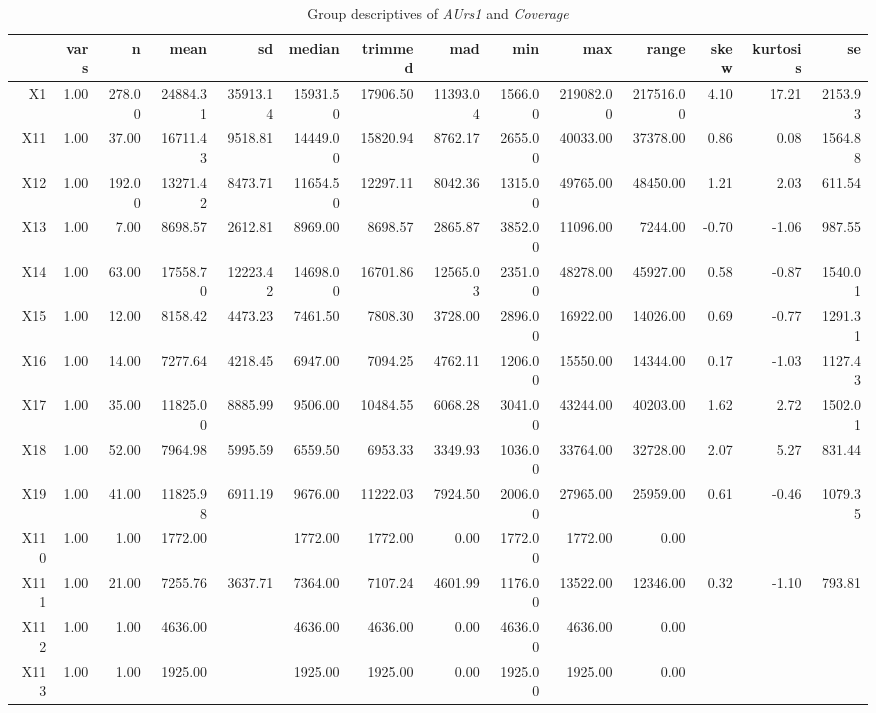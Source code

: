 \begin{table}[ht]
	\small
	\centering
	\begin{tabular}{rrrrrrrrrrrrrr}
		\hline
	   & vars & n & mean & sd & median & trimmed & mad & min & max & range & skew & kurtosis & se \\ 
		\hline
	  X1 & 1.00 & 278.00 & 24884.31 & 35913.14 & 15931.50 & 17906.50 & 11393.04 & 1566.00 & 219082.00 & 217516.00 & 4.10 & 17.21 & 2153.93 \\ 
		X11 & 1.00 & 37.00 & 16711.43 & 9518.81 & 14449.00 & 15820.94 & 8762.17 & 2655.00 & 40033.00 & 37378.00 & 0.86 & 0.08 & 1564.88 \\ 
		X12 & 1.00 & 192.00 & 13271.42 & 8473.71 & 11654.50 & 12297.11 & 8042.36 & 1315.00 & 49765.00 & 48450.00 & 1.21 & 2.03 & 611.54 \\ 
		X13 & 1.00 & 7.00 & 8698.57 & 2612.81 & 8969.00 & 8698.57 & 2865.87 & 3852.00 & 11096.00 & 7244.00 & -0.70 & -1.06 & 987.55 \\ 
		X14 & 1.00 & 63.00 & 17558.70 & 12223.42 & 14698.00 & 16701.86 & 12565.03 & 2351.00 & 48278.00 & 45927.00 & 0.58 & -0.87 & 1540.01 \\ 
		X15 & 1.00 & 12.00 & 8158.42 & 4473.23 & 7461.50 & 7808.30 & 3728.00 & 2896.00 & 16922.00 & 14026.00 & 0.69 & -0.77 & 1291.31 \\ 
		X16 & 1.00 & 14.00 & 7277.64 & 4218.45 & 6947.00 & 7094.25 & 4762.11 & 1206.00 & 15550.00 & 14344.00 & 0.17 & -1.03 & 1127.43 \\ 
		X17 & 1.00 & 35.00 & 11825.00 & 8885.99 & 9506.00 & 10484.55 & 6068.28 & 3041.00 & 43244.00 & 40203.00 & 1.62 & 2.72 & 1502.01 \\ 
		X18 & 1.00 & 52.00 & 7964.98 & 5995.59 & 6559.50 & 6953.33 & 3349.93 & 1036.00 & 33764.00 & 32728.00 & 2.07 & 5.27 & 831.44 \\ 
		X19 & 1.00 & 41.00 & 11825.98 & 6911.19 & 9676.00 & 11222.03 & 7924.50 & 2006.00 & 27965.00 & 25959.00 & 0.61 & -0.46 & 1079.35 \\ 
		X110 & 1.00 & 1.00 & 1772.00 &  & 1772.00 & 1772.00 & 0.00 & 1772.00 & 1772.00 & 0.00 &  &  &  \\ 
		X111 & 1.00 & 21.00 & 7255.76 & 3637.71 & 7364.00 & 7107.24 & 4601.99 & 1176.00 & 13522.00 & 12346.00 & 0.32 & -1.10 & 793.81 \\ 
		X112 & 1.00 & 1.00 & 4636.00 &  & 4636.00 & 4636.00 & 0.00 & 4636.00 & 4636.00 & 0.00 &  &  &  \\ 
		X113 & 1.00 & 1.00 & 1925.00 &  & 1925.00 & 1925.00 & 0.00 & 1925.00 & 1925.00 & 0.00 &  &  &  \\ 
		 \hline
	  \end{tabular}
    \caption{Group descriptives of \textit{AUrs1} and \textit{Coverage}}
    \label{tbl:descriptives_baysis_effector_AUrs1_Cov}
\end{table}
